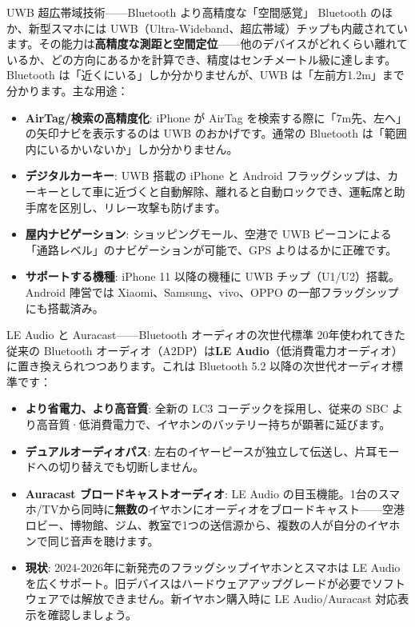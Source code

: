 \begin{tcbinfo}{UWB 超広帯域技術——Bluetooth より高精度な「空間感覚」}
Bluetooth のほか、新型スマホには UWB（Ultra-Wideband、超広帯域）チップも内蔵されています。その能力は\textbf{高精度な測距と空間定位}——他のデバイスがどれくらい離れているか、どの方向にあるかを計算でき、精度はセンチメートル級に達します。Bluetooth は「近くにいる」しか分かりませんが、UWB は「左前方1.2m」まで分かります。主な用途：

\begin{itemize}
  \item \textbf{AirTag/検索の高精度化}: iPhone が AirTag を検索する際に「7m先、左へ」の矢印ナビを表示するのは UWB のおかげです。通常の Bluetooth は「範囲内にいるかいないか」しか分かりません。
  \item \textbf{デジタルカーキー}: UWB 搭載の iPhone と Android フラッグシップは、カーキーとして車に近づくと自動解除、離れると自動ロックでき、運転席と助手席を区別し、リレー攻撃も防げます。
  \item \textbf{屋内ナビゲーション}: ショッピングモール、空港で UWB ビーコンによる「通路レベル」のナビゲーションが可能で、GPS よりはるかに正確です。
  \item \textbf{サポートする機種}: iPhone 11 以降の機種に UWB チップ（U1/U2）搭載。Android 陣営では Xiaomi、Samsung、vivo、OPPO の一部フラッグシップにも搭載済み。
\end{itemize}

\end{tcbinfo}

\begin{tcbinfo}{LE Audio と Auracast——Bluetooth オーディオの次世代標準}
20年使われてきた従来の Bluetooth オーディオ（A2DP）は\textbf{LE Audio}（低消費電力オーディオ）に置き換えられつつあります。これは Bluetooth 5.2 以降の次世代オーディオ標準です：

\begin{itemize}
  \item \textbf{より省電力、より高音質}: 全新の LC3 コーデックを採用し、従来の SBC より高音質·低消費電力で、イヤホンのバッテリー持ちが顕著に延びます。
  \item \textbf{デュアルオーディオパス}: 左右のイヤーピースが独立して伝送し、片耳モードへの切り替えでも切断しません。
  \item \textbf{Auracast ブロードキャストオーディオ}: LE Audio の目玉機能。1台のスマホ/TVから同時に\textbf{無数の}イヤホンにオーディオをブロードキャスト——空港ロビー、博物館、ジム、教室で1つの送信源から、複数の人が自分のイヤホンで同じ音声を聴けます。
  \item \textbf{現状}: 2024-2026年に新発売のフラッグシップイヤホンとスマホは LE Audio を広くサポート。旧デバイスはハードウェアアップグレードが必要でソフトウェアでは解放できません。新イヤホン購入時に LE Audio/Auracast 対応表示を確認しましょう。
\end{itemize}

\end{tcbinfo}

